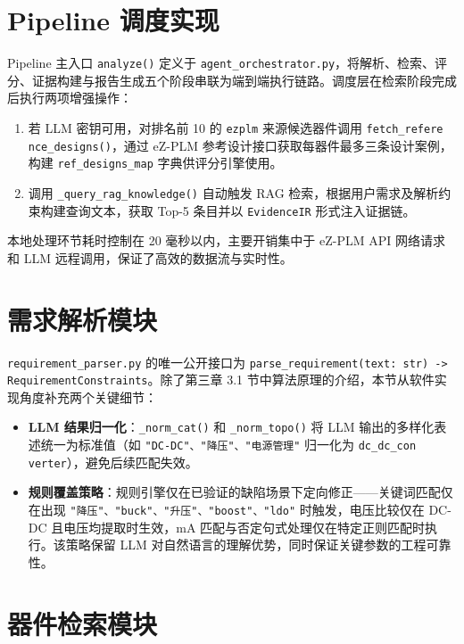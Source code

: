 \section{Pipeline 调度实现}

Pipeline 主入口 \texttt{analyze()} 定义于 \texttt{agent\_orchestrator.py}，将解析、检索、评分、证据构建与报告生成五个阶段串联为端到端执行链路。调度层在检索阶段完成后执行两项增强操作：

\begin{enumerate}
\item 若 LLM 密钥可用，对排名前 10 的 \texttt{ezplm} 来源候选器件调用 \texttt{fetch\_refere\\nce\_designs()}，通过 eZ-PLM 参考设计接口获取每器件最多三条设计案例，构建 \texttt{ref\_designs\_map} 字典供评分引擎使用。
\item 调用 \texttt{\_query\_rag\_knowledge()} 自动触发 RAG 检索，根据用户需求及解析约束构建查询文本，获取 Top-5 条目并以 \texttt{EvidenceIR} 形式注入证据链。
\end{enumerate}

本地处理环节耗时控制在 20 毫秒以内，主要开销集中于 eZ-PLM API 网络请求和 LLM 远程调用，保证了高效的数据流与实时性。

\section{需求解析模块}

\texttt{requirement\_parser.py} 的唯一公开接口为 \texttt{parse\_requirement(text: str) -> RequirementConstraints}。除了第三章 3.1 节中算法原理的介绍，本节从软件实现角度补充两个关键细节：

\begin{itemize}
\item \textbf{LLM 结果归一化}：\texttt{\_norm\_cat()} 和 \texttt{\_norm\_topo()} 将 LLM 输出的多样化表述统一为标准值（如 \texttt{"DC-DC"、"降压"、"电源管理"} 归一化为 \texttt{dc\_dc\_con\\verter}），避免后续匹配失效。
\item \textbf{规则覆盖策略}：规则引擎仅在已验证的缺陷场景下定向修正——关键词匹配仅在出现 \texttt{"降压"、"buck"、"升压"、"boost"、"ldo"} 时触发，电压比较仅在 DC-DC 且电压均提取时生效，mA 匹配与否定句式处理仅在特定正则匹配时执行。该策略保留 LLM 对自然语言的理解优势，同时保证关键参数的工程可靠性。
\end{itemize}

\section{器件检索模块}

